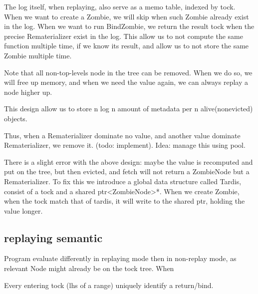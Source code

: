 The log itself, when replaying, also serve as a memo table, indexed by tock. When we want to create a Zombie, we will skip when such Zombie already exist in the log. When we want to run BindZombie, we return the result tock when the precise Rematerializer exist in the log. This allow us to not compute the same function multiple time, if we know its result, and allow us to not store the same Zombie multiple time.

Note that all non-top-levels node in the tree can be removed. When we do so, we will free up memory, and when we need the value again, we can always replay a node higher up.

This design allow us to store n log n amount of metadata per n alive(nonevicted) objects.

Thus, when a Rematerializer dominate no value, and another value dominate Rematerializer, we remove it. (todo: implement). Idea: manage this using pool.

There is a slight error with the above design: maybe the value is recomputed and put on the tree, but then evicted, and fetch will not return a ZombieNode but a Rematerializer. To fix this we introduce a global data structure called Tardis, consist of a tock and a shared ptr<ZombieNode>*. When we create Zombie, when the tock match that of tardis, it will write to the shared ptr, holding the value longer.

\subsection{replaying semantic}
Program evaluate differently in replaying mode then in non-replay mode, as relevant Node might already be on the tock tree. When 

Every entering tock (lhs of a range) uniquely identify a return/bind.




